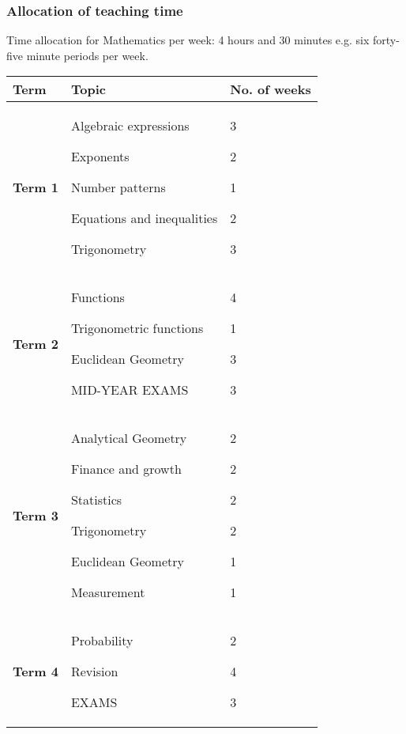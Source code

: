\subsubsection{Allocation of teaching time}
Time allocation for Mathematics per week: 4 hours and 30 minutes e.g. six forty-five minute periods per week.
\begin{table}[H]
 \begin{center} 
\begin{tabular}{|p{2cm}|p{6cm}|p{2cm}|} \hline
\textbf{Term}& \textbf{Topic} & \textbf{No. of weeks} \\ \hline  
\textbf{Term 1} & Algebraic expressions \par
Exponents\par
Number patterns \par
Equations and inequalities\par
Trigonometry

&
3\par
2\par
1\par
2\par
3 \\ \hline
\textbf{Term 2} & Functions \par
Trigonometric functions  \par
Euclidean Geometry  \par
MID-YEAR EXAMS &
4  \par
1 \par
3  \par
3  \\ \hline

\textbf{Term 3} & Analytical Geometry \par
Finance and growth \par
Statistics \par
Trigonometry \par
Euclidean Geometry\par
Measurement &
2 \par
2\par
2\par
2\par
1\par
1 \\ \hline
\textbf{Term 4} & Probability \par Revision \par EXAMS &
2 \par 
4 \par 
3 \\ \hline


 \end{tabular}
\end{center}
\end{table}

